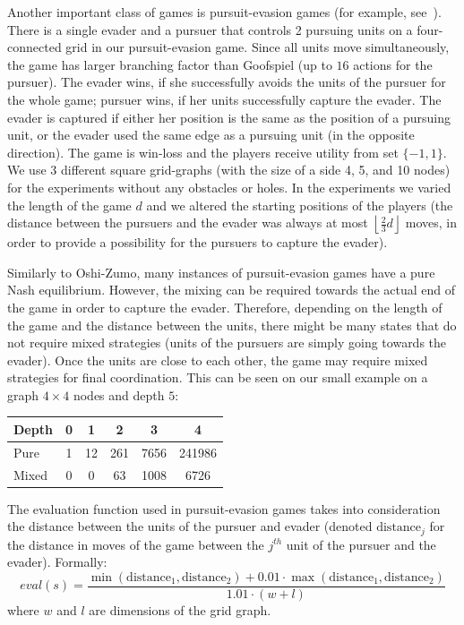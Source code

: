Another important class of games is pursuit-evasion games (for example, see~\cite{nguyen2013monte}).
There is a single evader and a pursuer that controls 2 pursuing units on a four-connected grid in our pursuit-evasion game. 
Since all units move simultaneously, the game has larger branching factor than Goofspiel (up to $16$ actions for the pursuer).
The evader wins, if she successfully avoids the units of the pursuer for the whole game; pursuer wins, if her units successfully capture the evader. The evader is captured if either her position is the same as the position of a pursuing unit, or the evader used the same edge as a pursuing unit (in the opposite direction). 
The game is win-loss and the players receive utility from set $\lbrace -1, 1 \rbrace$.
We use $3$ different square grid-graphs (with the size of a side 4, 5, and 10 nodes) for the experiments without any obstacles or holes.
In the experiments we varied the length of the game $d$ and we altered the starting positions of the players (the distance between the pursuers and the evader was always at most $\left\lfloor\frac{2}{3} d\right\rfloor$ moves, in order to provide a possibility for the pursuers to capture the evader).

Similarly to Oshi-Zumo, many instances of pursuit-evasion games have a pure Nash equilibrium.
However, the mixing can be required towards the actual end of the game in order to capture the evader.
Therefore, depending on the length of the game and the distance between the units, there might be many states that do not require mixed strategies (units of the pursuers are simply going towards the evader).
Once the units are close to each other, the game may require mixed strategies for final coordination. 
This can be seen on our small example on a graph $4\times4$ nodes and depth $5$:

\begin{table}[h!]
\centering
\small
\begin{tabular}{|l|c|c|c|c|c|}
\hline Depth & 0 & 1 & 2 & 3 & 4 \\
\hline Pure  & 1 & 12 & 261 & 7656 & 241986 \\
\hline Mixed & 0 & 0 & 63 & 1008 & 6726 \\
\hline
\end{tabular}
\end{table}
\vspace{1cm}
The evaluation function used in pursuit-evasion games takes into consideration the distance between the units of the pursuer and evader (denoted $\textrm{distance}_j$ for the distance in moves of the game between the $j^{th}$ unit of the pursuer and the evader). Formally:
$$
eval(s) = \frac{\min(\textrm{distance}_1,\textrm{distance}_2) + 0.01\cdot\max(\textrm{distance}_1,\textrm{distance}_2)}{1.01 \cdot (w+l)}
$$
where $w$ and $l$ are dimensions of the grid graph.

